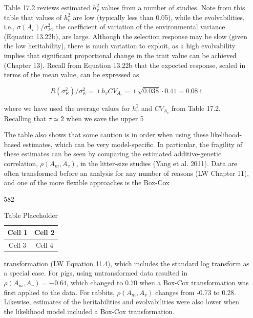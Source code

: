 \documentclass{article}
\begin{document}
Table 17.2 reviews estimated  $ h_v^2 $ values from a number of studies. Note from this table that values of  $ h_v^2 $ are low (typically less than 0.05), while the evolvabilities, i.e.,  $ \sigma(A_v)/\sigma_E^2 $, the coefficient of variation of the environmental variance (Equation 13.22b), are large. Although the selection response may be slow (given the low heritability), there is much variation to exploit, as a high evolvability implies that significant proportional change in the trait value can be achieved (Chapter 13). Recall from Equation 13.22b that the expected response, scaled in terms of the mean value, can be expressed as

\begin{equation}
R(\sigma_{E}^{2})/\sigma_{E}^{2}=\bar{\imath}h_{v}CV_{A_{v}}=\bar{\imath}\sqrt{0.038}\cdot0.41=0.08\bar{\imath}
\end{equation}

where we have used the average values for  $ h_v^2 $ and  $ CV_{A_v} $ from Table 17.2. Recalling that  $ \bar{\tau} \simeq 2 $ when we save the upper 5%

The table also shows that some caution is in order when using these likelihood-based estimates, which can be very model-specific. In particular, the fragility of these estimates can be seen by comparing the estimated additive-genetic correlation,  $ \rho(A_m, A_v) $, in the litter-size studies (Yang et al. 2011). Data are often transformed before an analysis for any number of reasons (LW Chapter 11), and one of the more flexible approaches is the Box-Cox

582

\begin{table}[h]
\centering
\begin{tabular}{|c|c|}
\hline
Cell 1 & Cell 2 \\
\hline
Cell 3 & Cell 4 \\
\hline
\end{tabular}
\caption{Table Placeholder}
\end{table}

transformation (LW Equation 11.4), which includes the standard log transform as a special case. For pigs, using untransformed data resulted in  $ \rho(A_m, A_v) = -0.64 $, which changed to 0.70 when a Box-Cox transformation was first applied to the data. For rabbits,  $ \rho(A_m, A_v) $ changes from -0.73 to 0.28. Likewise, estimates of the heritabilities and evolvabilities were also lower when the likelihood model included a Box-Cox transformation.
\end{document}
